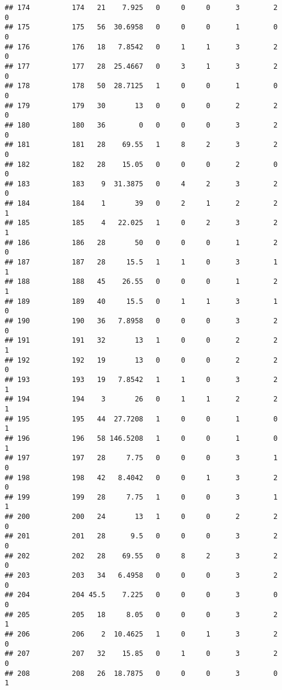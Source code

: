 \documentclass[
]{article}
\begin{document}
\begin{verbatim}
## 174          174   21    7.925   0     0     0      3        2         0
## 175          175   56  30.6958   0     0     0      1        0         0
## 176          176   18   7.8542   0     1     1      3        2         0
## 177          177   28  25.4667   0     3     1      3        2         0
## 178          178   50  28.7125   1     0     0      1        0         0
## 179          179   30       13   0     0     0      2        2         0
## 180          180   36        0   0     0     0      3        2         0
## 181          181   28    69.55   1     8     2      3        2         0
## 182          182   28    15.05   0     0     0      2        0         0
## 183          183    9  31.3875   0     4     2      3        2         0
## 184          184    1       39   0     2     1      2        2         1
## 185          185    4   22.025   1     0     2      3        2         1
## 186          186   28       50   0     0     0      1        2         0
## 187          187   28     15.5   1     1     0      3        1         1
## 188          188   45    26.55   0     0     0      1        2         1
## 189          189   40     15.5   0     1     1      3        1         0
## 190          190   36   7.8958   0     0     0      3        2         0
## 191          191   32       13   1     0     0      2        2         1
## 192          192   19       13   0     0     0      2        2         0
## 193          193   19   7.8542   1     1     0      3        2         1
## 194          194    3       26   0     1     1      2        2         1
## 195          195   44  27.7208   1     0     0      1        0         1
## 196          196   58 146.5208   1     0     0      1        0         1
## 197          197   28     7.75   0     0     0      3        1         0
## 198          198   42   8.4042   0     0     1      3        2         0
## 199          199   28     7.75   1     0     0      3        1         1
## 200          200   24       13   1     0     0      2        2         0
## 201          201   28      9.5   0     0     0      3        2         0
## 202          202   28    69.55   0     8     2      3        2         0
## 203          203   34   6.4958   0     0     0      3        2         0
## 204          204 45.5    7.225   0     0     0      3        0         0
## 205          205   18     8.05   0     0     0      3        2         1
## 206          206    2  10.4625   1     0     1      3        2         0
## 207          207   32    15.85   0     1     0      3        2         0
## 208          208   26  18.7875   0     0     0      3        0         1

\end{verbatim}
\end{document}
